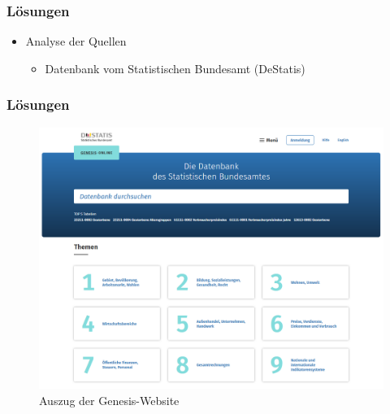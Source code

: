 \documentclass{beamer}
\begin{document}
\begin{frame}
	\frametitle{Lösungen}
	\begin{itemize}
		\item Analyse der Quellen
			\begin{itemize}
				\item Datenbank vom Statistischen Bundesamt (DeStatis)
			\end{itemize}
	\end{itemize}
\end{frame}

\begin{frame}
	\frametitle{Lösungen}
	\begin{figure}[h]
		\caption{Auszug der Genesis-Website}
		\centering
		\includegraphics[scale=0.15]{6_Denesis_Destatis}
	\end{figure}
\end{frame}
\end{document}
